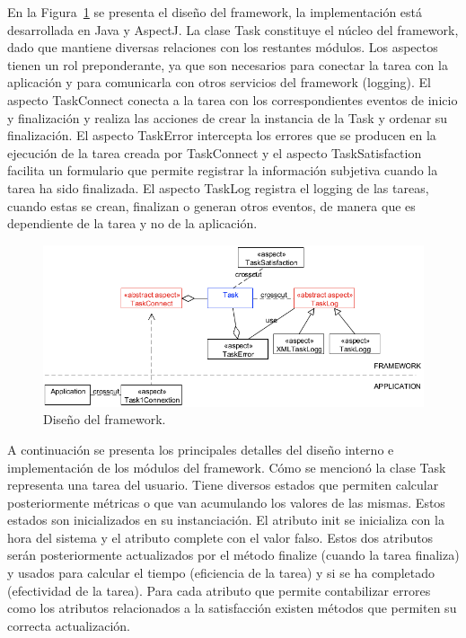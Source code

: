 En la Figura~\ref{fig:fig3} se presenta el diseño del framework, la implementación está desarrollada en Java y AspectJ. La clase Task constituye el núcleo del framework, dado que mantiene diversas relaciones con los restantes módulos. Los aspectos tienen un rol preponderante, ya que son necesarios para conectar la tarea con la aplicación y para comunicarla con otros servicios del framework (logging). El aspecto TaskConnect conecta a la tarea con los correspondientes eventos de inicio y finalización y realiza las acciones de crear la instancia de la Task y ordenar su finalización. El aspecto TaskError intercepta los errores que se producen en la ejecución de la tarea creada por TaskConnect y el aspecto TaskSatisfaction facilita un formulario que permite registrar la información subjetiva cuando la tarea ha sido finalizada. El aspecto TaskLog registra el logging de las tareas, cuando estas se crean, finalizan o generan otros eventos, de manera que es dependiente de la tarea y no de la aplicación. 
\begin{figure}[ht!]
	\centering
	\includegraphics[scale=0.47]{figs/fig3.png}
	\caption{\label{fig:fig3}  Diseño del framework.}
\end{figure}
A continuación se presenta los principales detalles del diseño interno e implementación de los módulos del framework. Cómo se mencionó la clase Task representa una tarea del usuario. Tiene diversos estados que permiten calcular posteriormente métricas o que van acumulando los valores de las mismas. Estos estados son inicializados en su instanciación. El atributo init se inicializa con la hora del sistema y el atributo complete con el valor falso. Estos dos atributos serán posteriormente actualizados por el método finalize (cuando la tarea finaliza) y usados para calcular el tiempo (eficiencia de la tarea) y si se ha completado (efectividad de la tarea). Para cada atributo que permite contabilizar errores como los atributos relacionados a la satisfacción existen métodos que permiten su correcta actualización. 

